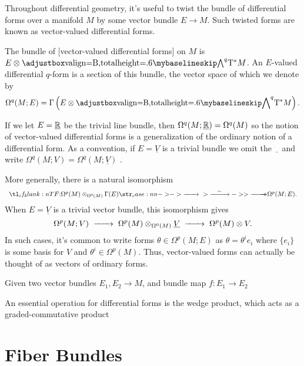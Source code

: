 Throughout differential geometry, it's useful to twist the bundle of differential forms over a manifold $M$ by some vector bundle $E\to M$. Such twisted forms are known as vector-valued differential forms.

\begin{definition}
  The bundle of [vector-valued differential forms] on $M$ is $E\otimes \alt^q \T^*M$. An $E$-valued differential $q$-form is a section of this bundle, the vector space of which we denote by
  \[
    \Omega^q(M; E) = \Gamma\left(E\otimes \alt^q \T^\d M\right).
  \]
\end{definition}

If we let $E=\underline{\mathbb{R}}$ be the trivial line bundle, then $\Omega^q(M; \underline{\mathbb{R}})=\Omega^q(M)$ so the notion of vector-valued differential forms is a generalization of the ordinary notion of a differential form. As a convention, if $E=\underline{V}$ is a trivial bundle we omit the $\underline{\phantom{V}}$ and write $\Omega^q(M; V)=\Omega^q(M; \underline{V})$ .

More generally, there is a natural isomorphism
\[
  \lkxfunc{}{\Omega^p(M)\otimes_{\Omega^0(M)} \Gamma(E)}{\Omega^p(M; E).}
\]
When $E=\underline{V}$ is a trivial vector bundle, this isomorphism gives \[\Omega^p(M;V)\lkxto \Omega^p(M)\otimes_{\Omega^0(M)}\underline{V}\lkxto \Omega^p(M)\otimes V.\]
In such cases, it's common to write forms $\theta\in \Omega^p(M; E)$ as $\theta =  \theta^i e_i$ where $\{e_i\}$ is some basis for $V$ and $\theta^i\in \Omega^p(M)$. Thus, vector-valued forms can actually be thought of as vectors of ordinary forms.

Given two vector bundles $E_1,E_2 \to M$, and bundle map $f : E_1\to E_2$

An essential operation for differential forms is the wedge product, which acts as a graded-commutative product



\section{Fiber Bundles}

